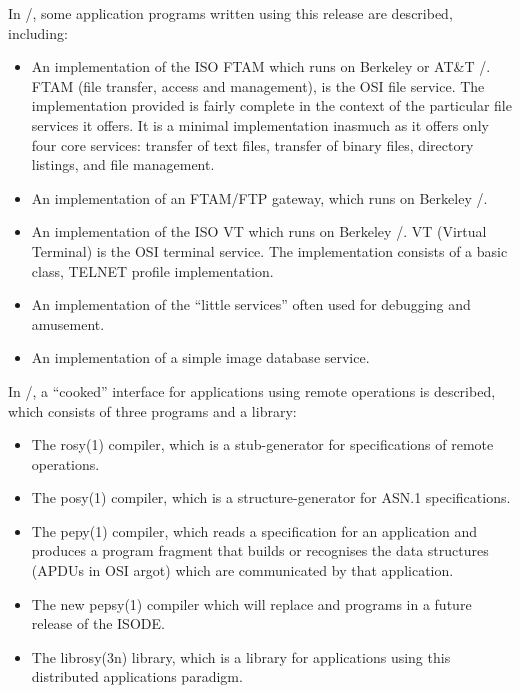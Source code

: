 In \volthree/,
some application programs written using this release are described,
including:
\begin{itemize}
\item	An implementation of the ISO FTAM
	which runs on Berkeley or AT\&T \unix/.
	FTAM (file transfer, access and management),
	is the OSI file service.
	The implementation provided is fairly complete in the context
	of the particular file services it offers.
	It is a minimal implementation inasmuch as it offers only four core
	services: transfer of text files, transfer of binary files,
	directory listings, and file management.

\item	An implementation of an FTAM/FTP gateway,
	which runs on Berkeley \unix/.

\item	An implementation of the ISO VT
	which runs on Berkeley \unix/.
	VT (Virtual Terminal) is the OSI terminal service.
	The implementation consists of a basic class, TELNET profile
	implementation.

\item	An implementation of the ``little services'' often used for debugging
	and amusement.

\item	An implementation of a simple image database service.
\end{itemize}

In \volfour/,
a ``cooked'' interface for applications using remote operations is described,
which consists of three programs and a library:
\begin{itemize}
\item	The \man rosy(1) compiler,
	which is a stub-generator for specifications of remote operations.

\item	The \man posy(1) compiler,
	which is a structure-generator for ASN.1 specifications.

\item	The \man pepy(1) compiler,
	which reads a specification for an application and produces a program
	fragment that builds or recognises the data structures (APDUs in OSI
	argot) which are communicated by that application.

\item	The new \man pepsy(1) compiler which will replace 
	and  programs in a future release of the ISODE.

\item	The \man librosy(3n) library,
	which is a library for applications using this distributed
	applications paradigm.
\end{itemize}

